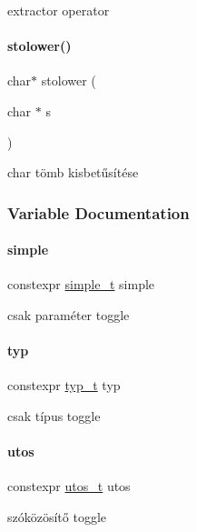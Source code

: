 extractor operator 

\mbox{\label{schtring_8hpp_a9d7d0d0ea2b8f0f7c6d53fe66fc0b301}} 
\paragraph{\texorpdfstring{stolower()}{stolower()}}
{\footnotesize\ttfamily char$\ast$ stolower (\begin{DoxyParamCaption}\item[{char $\ast$}]{s }\end{DoxyParamCaption})}



char tömb kisbetűsítése 



\subsubsection{Variable Documentation}
\mbox{\label{schtring_8hpp_a351fc938310737ce89abd87ce1c8012c}} 
\paragraph{\texorpdfstring{simple}{simple}}
{\footnotesize\ttfamily constexpr \mbox{\hyperlink{structsimple__t}{simple\+\_\+t}} simple}



csak paraméter toggle 

\mbox{\label{schtring_8hpp_ab0a950c0c78f879bd8908b430a0a074c}} 
\paragraph{\texorpdfstring{typ}{typ}}
{\footnotesize\ttfamily constexpr \mbox{\hyperlink{structtyp__t}{typ\+\_\+t}} typ}



csak típus toggle 

\mbox{\label{schtring_8hpp_a87ab25645bb130a0e89654a4ba9d2bce}} 
\paragraph{\texorpdfstring{utos}{utos}}
{\footnotesize\ttfamily constexpr \mbox{\hyperlink{structutos__t}{utos\+\_\+t}} utos}



szóközösítő toggle 

